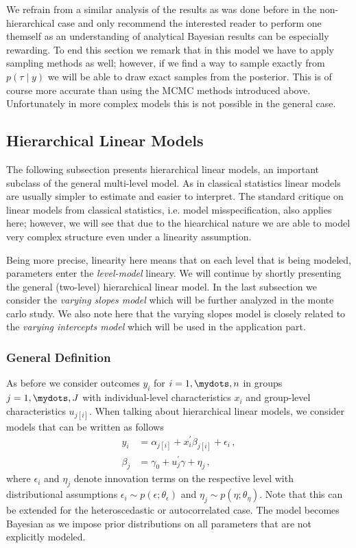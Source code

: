 We refrain from a similar analysis of the results as was done before in the non-hierarchical case and only recommend the interested reader to perform one themself as an understanding of analytical Bayesian results can be especially rewarding.
To end this section we remark that in this model we have to apply sampling methods as well; however, if we find a way to sample exactly from $p(\tau \mid y)$ we will be able to draw exact samples from the posterior.
This is of course more accurate than using the MCMC methods introduced above.
Unfortunately in more complex models this is not possible in the general case.

\subsection{Hierarchical Linear Models}
The following subsection presents hierarchical linear models, an important subclass of the general multi-level model.
As in classical statistics linear models are usually simpler to estimate and easier to interpret.
The standard critique on linear models from classical statistics, i.e. model misspecification, also applies here; however, we will see that due to the hiearchical nature we are able to model very complex structure even under a linearity assumption.

Being more precise, linearity here means that on each level that is being modeled, parameters enter the \emph{level-model} lineary.
We will continue by shortly presenting the general (two-level) hierarchical linear model.
In the last subsection we consider the \emph{varying slopes model} which will be further analyzed in the monte carlo study.
We also note here that the varying slopes model is closely related to the \emph{varying intercepts model} which will be used in the application part.

\subsubsection*{General Definition}
As before we consider outcomes $y_i$ for $i=1,\mydots,n$ in groups $j=1,\mydots,J$ with individual-level characteristics $x_i$ and group-level characteristics $u_{j[i]}$.
When talking about hierarchical linear models, we consider models that can be written as follows
\begin{align}
  y_i &= \alpha_{j[i]} + x_i^\prime \beta_{j[i]} + \epsilon_i \,,\\
  \beta_j &= \gamma_0 + u_j^\prime \gamma + \eta_j \,,
\end{align}
where $\epsilon_i$ and $\eta_j$ denote innovation terms on the respective level with distributional assumptions $\epsilon_i \sim p(\epsilon; \theta_\epsilon)$ and $\eta_j \sim p(\eta; \theta_\eta)$.
Note that this can be extended for the heteroscedastic or autocorrelated case.
The model becomes Bayesian as we impose prior distributions on all parameters that are not explicitly modeled.

